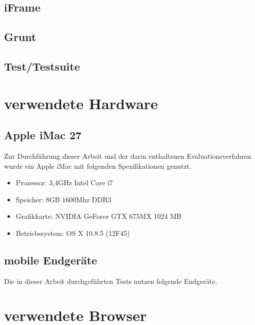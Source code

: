		\subsection{iFrame}
		\subsection{Grunt}
		\subsection{Test/Testsuite}
	
	\section{verwendete Hardware}
	
	\subsection{Apple iMac 27\texttt\dq}
	Zur Durchführung dieser Arbeit und der darin enthaltenen Evaluationsverfahren wurde ein Apple iMac mit folgenden 				Spezifikationen genutzt.
	\begin{itemize} 
		\item Prozessor: 3,4GHz Intel Core i7 
		\item Speicher: 8GB 1600Mhz DDR3
		\item Grafikkarte: NVIDIA GeForce GTX 675MX 1024 MB
		\item Betriebssystem: OS X 10.8.5 (12F45)
	\end{itemize}
	
	\pagebreak
	\subsection{mobile Endgeräte}
	Die in dieser Arbeit durchgeführten Tests nutzen folgende Endgeräte. 
	
	
	\pagebreak
	\section{verwendete Browser}
	
